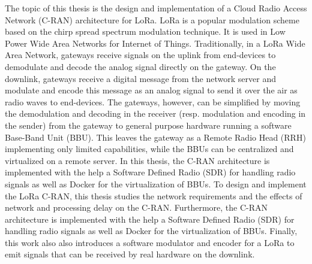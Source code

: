 The topic of this thesis is the design and implementation of a Cloud Radio Access Network (C-RAN) architecture for LoRa. 
LoRa is a popular modulation scheme based on the chirp spread spectrum modulation technique. 
It is used in Low Power Wide Area Networks for Internet of Things. 
Traditionally, in a LoRa Wide Area Network, gateways receive signals on the uplink from end-devices to demodulate and decode the analog signal directly on the gateway.
On the downlink, gateways receive a digital message from the network server and modulate and encode this message as an analog signal to send it over the air as radio waves to end-devices.
The gateways, however, can be simplified by moving the demodulation and decoding in the receiver (resp. modulation and encoding in the sender) from the gateway to general purpose hardware running a software Base-Band Unit (BBU). 
This leaves the gateway as a Remote Radio Head (RRH) implementing only limited capabilities, while the BBUs can be centralized and virtualized on a remote server.
In this thesis, the C-RAN architecture is implemented with the help a Software Defined Radio (SDR) for handling radio signals as well as 
Docker for the virtualization of BBUs. 
To design and implement the LoRa C-RAN, this thesis studies the network requirements and the effects of network and processing delay on the C-RAN. 
Furthermore, the C-RAN architecture is implemented with the help a Software Defined Radio (SDR) for handling radio signals as well as 
Docker for the virtualization of BBUs. 
Finally, this work also also introduces a software modulator and encoder for a LoRa to emit signals that can be received by real hardware on the downlink. 

